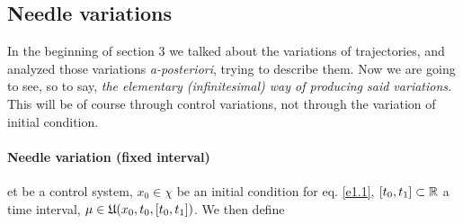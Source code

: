 \subsection{Needle variations}
In the beginning of section 3 we talked about the variations of trajectories, and analyzed those variations \textit{a-posteriori}, trying to describe them. Now we are going to see, so to say, \textit{the elementary (infinitesimal) way of producing said variations.} This will be of course through control variations, not through the variation of initial condition.


\paragraph{Needle variation (fixed interval)}
et \controlSystem be a control system, $x_0\in\chi$ be an initial condition for eq. \ref{e1.1}, $[t_0,t_1]\subset\mathbb{R}$ a time interval, $\mu\in\mathfrak{U}(x_0,t_0,[t_0,t_1])$. We then define 

